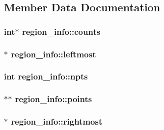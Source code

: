 \subsection{Member Data Documentation}
\hypertarget{structregion__info_af4ed1f6cecbf7c31f1b849bd1cf68f63}{
\subsubsection[{counts}]{\setlength{\rightskip}{0pt plus 5cm}int$\ast$ region\-\_\-info\-::counts}}\label{structregion__info_af4ed1f6cecbf7c31f1b849bd1cf68f63}
\hypertarget{structregion__info_a95f5424c3d201a98ca861fe07b85b803}{
\subsubsection[{leftmost}]{$\ast$ region\-\_\-info\-::leftmost}}\label{structregion__info_a95f5424c3d201a98ca861fe07b85b803}
\hypertarget{structregion__info_a1e35c9ccb01bd99b55d24aa6829d19d9}{
\subsubsection[{npts}]{\setlength{\rightskip}{0pt plus 5cm}int region\-\_\-info\-::npts}}\label{structregion__info_a1e35c9ccb01bd99b55d24aa6829d19d9}
\hypertarget{structregion__info_a6a51b82586ad9e05d79a0af19d757c70}{
\subsubsection[{points}]{$\ast$$\ast$ region\-\_\-info\-::points}}\label{structregion__info_a6a51b82586ad9e05d79a0af19d757c70}
\hypertarget{structregion__info_a323986dad7805accde6cfb51fcaee905}{
\subsubsection[{rightmost}]{$\ast$ region\-\_\-info\-::rightmost}}\label{structregion__info_a323986dad7805accde6cfb51fcaee905}
